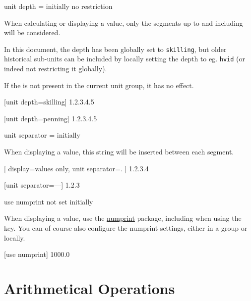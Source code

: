 \documentclass[
	a4paper,
	margin=4cm
]{article}
\begin{document}
\begin{docKey}
	{unit depth}
	{=}
	{initially no restriction}
	
	When calculating or displaying a value, only the segments up to and including  will be considered.
	
	In this document, the depth has been globally set to \texttt{skilling}, but older historical sub-units can be included by locally setting the depth to eg. \texttt{hvid} (or indeed not restricting it globally).
	
	If the  is not present in the current unit group, it has no effect.
	
\begin{dispExample}
	[unit depth=skilling]
	{1.2.3.4.5}

	[unit depth=penning]
	{1.2.3.4.5}
\end{dispExample}
\end{docKey}

\begin{docKey}
	{unit separator}
	{=}
	{initially }
	
	When displaying a value, this string will be inserted between each segment.

\begin{dispExample}
[
		display=values only,
		unit separator=.
	]
	{1.2.3.4}

	[unit separator={---}]
	{1.2.3}
\end{dispExample}

\end{docKey}

\begin{docKey}
	{use numprint}
	{}
	{not set initially}
	
	When displaying a value, use the \href{https://ctan.org/pkg/numprint}{numprint} package, including when using the  key. You can of course also configure the numprint settings, either in a group or locally.

\begin{dispExample}
\begingroup
{}
	[use numprint]
	{1000.0}
\endgroup
\end{dispExample}

\end{docKey}

\clearpage
\section{Arithmetical Operations} %
\end{document}

